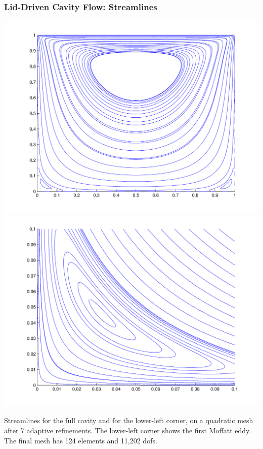\documentclass[mathserif]{beamer}
\begin{document}
\begin{frame}
\frametitle{Lid-Driven Cavity Flow: Streamlines}
\begin{center}
{\setlength{\fboxsep}{1pt}\colorbox{pecos2}{\includegraphics[scale=0.25]{../figures/streamlines_p2_r7.pdf}}} \hspace{5mm} {\setlength{\fboxsep}{1pt}\colorbox{pecos2}{\includegraphics[scale=0.25]{../figures/streamlines_detail_p2_r7.pdf}}}
\end{center}
Streamlines for the full cavity and for the lower-left corner, on a quadratic mesh after 7 adaptive refinements.  The lower-left corner shows the first Moffatt eddy.  The final mesh has 124 elements and 11,202 dofs.
\end{frame}
\end{document}
